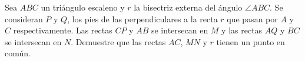 Sea $ABC$ un triángulo escaleno y $r$ la bisectriz externa del ángulo $\angle ABC$. Se consideran $P$ y $Q$, los pies de las perpendiculares a la recta $r$ que pasan por $A$ y $C$ respectivamente. Las rectas $CP$ y $AB$ se intersecan en $M$ y las rectas $AQ$ y $BC$ se intersecan en $N$. Demuestre que las rectas $AC$, $MN$ y $r$ tienen un punto en común.
